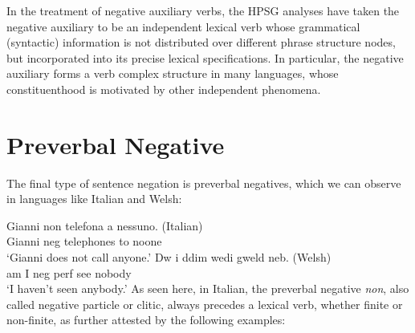 \documentclass[output=paper
                ,modfonts
		,nonflat
	        ,collection
	        ,collectionchapter
	        ,collectiontoclongg
 	        ,biblatex  
                ,babelshorthands
                ,newtxmath
                ,draftmode
                ,colorlinks, citecolor=brown 
]{./langsci/langscibook}
\begin{document}
{\begin{exe}
\begin{xlist}
In the treatment of negative auxiliary verbs, the HPSG analyses
have taken the negative auxiliary to be an independent lexical
verb whose grammatical (syntactic) information is not distributed
over different phrase structure nodes, but incorporated into
its precise lexical specifications. In particular, the negative
auxiliary forms a verb complex structure in many languages, whose
constituenthood is motivated by other independent phenomena.



\section{Preverbal Negative}

The final type of sentence negation is preverbal negatives, which
we can observe in languages like Italian and Welsh:

\eal
\ex \label{position-1a}
\gll Gianni non telefona a nessuno. (Italian) \\
     Gianni {\sc neg} telephones to noone\\
\glt`Gianni does not call anyone.'
\ex \label{position-1c}
\gll Dw i ddim wedi gweld neb. (Welsh) \\
     am I {\sc neg} {\sc perf} see nobody\\
\glt `I haven't seen anybody.'
\zl
%
%
As seen here, in Italian,
the preverbal negative \emph{non}, also called negative particle or
clitic, always precedes a lexical  verb, whether finite or
non-finite, as further attested by the following
examples:

\eal
\zl


\end{xlist}
\end{exe}}
\end{document}
